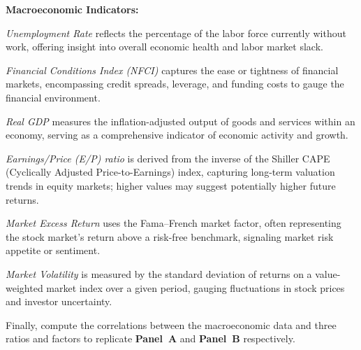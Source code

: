 \par
\textbf{Macroeconomic Indicators:}

\textit{Unemployment Rate} reflects the percentage of the labor force currently without work, offering insight into overall economic health and labor market slack.

\textit{Financial Conditions Index (NFCI)} captures the ease or tightness of financial markets, encompassing credit spreads, leverage, and funding costs to gauge the financial environment.

\textit{Real GDP} measures the inflation-adjusted output of goods and services within an economy, serving as a comprehensive indicator of economic activity and growth.

\textit{Earnings/Price (E/P) ratio} is derived from the inverse of the Shiller CAPE (Cyclically Adjusted Price-to-Earnings) index, capturing long-term valuation trends in equity markets; higher values may suggest potentially higher future returns.

\textit{Market Excess Return} uses the Fama--French market factor, often representing the stock market's return above a risk-free benchmark, signaling market risk appetite or sentiment.

\textit{Market Volatility} is measured by the standard deviation of returns on a value-weighted market index over a given period, gauging fluctuations in stock prices and investor uncertainty.

\par
Finally, compute the correlations between the macroeconomic data and three ratios and factors to replicate \textbf{Panel~A} and \textbf{Panel~B} respectively.
